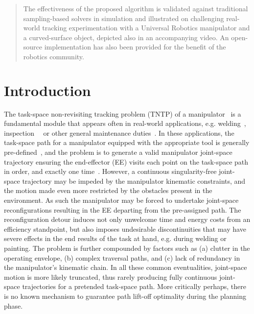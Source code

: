 \documentclass[letterpaper, 10 pt, conference]{ieeeconf}  %
\begin{document}
\begin{abstract}
The effectiveness of the proposed algorithm is validated against traditional sampling-based solvers in simulation and illustrated on challenging real-world tracking experimentation with a Universal Robotics manipulator and a curved-surface object, depicted also in an accompanying video. 
An open-source implementation has also been provided for the benefit of the robotics community. 
\end{abstract}

\section{Introduction}
The task-space non-revisiting tracking problem (TNTP) of a manipulator~\cite{Liang2010Adaptive} is a fundamental module that appears often in real-world applications, e.g.  welding~\cite{Norberto2003Welding}, inspection~\cite{Nakhaeinia2013Trajectory}~\cite{Simetti2016Underwater} or other general maintenance duties~\cite{Simetti2016Underwater}. 
In these applications, the task-space path for a manipulator equipped with the appropriate tool is generally pre-defined~\cite{Chen2019Synchronization}, and the problem is to generate a valid manipulator joint-space trajectory ensuring the end-effector (EE)  visits each point on the task-space path in order, and exactly one time~\cite{Janiak2017Motion}. 
However, a continuous singularity-free joint-space trajectory %
may be impeded by the manipulator kinematic constraints, and the motion made even more restricted by the obstacles present in the environment. As such the manipulator may be forced to undertake joint-space reconfigurations resulting in the EE departing from the pre-assigned path. 
The reconfiguration detour induces not only unwelcome time and energy costs from an efficiency standpoint, but also imposes undesirable discontinuities that may have severe effects in the end results of the task at hand, e.g. during welding or painting.  The problem is further compounded by factors such as (a) clutter in the operating envelope, (b) complex traversal paths, and (c) lack of redundancy in the manipulator's kinematic chain. In all these common eventualities, joint-space motion is more likely truncated, thus rarely producing fully continuous joint-space trajectories for a pretended task-space path. More critically perhaps, there is no known mechanism to guarantee path lift-off optimality during the planning phase. 
\end{document}
